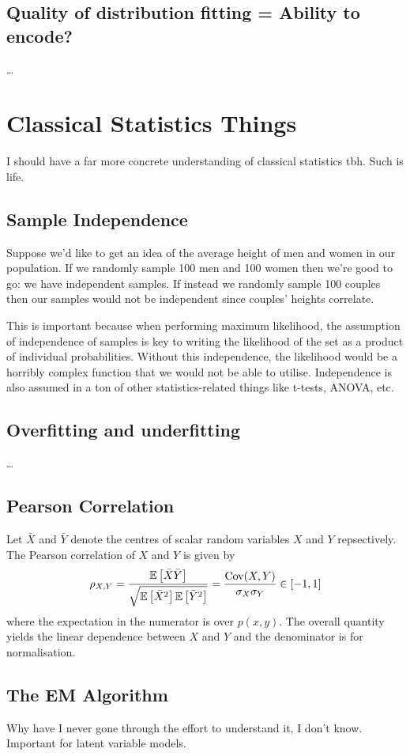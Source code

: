 \documentclass[11pt]{article}
\begin{document}
\begin{appendices}
\subsection{Quality of distribution fitting = Ability to encode?}
\dots

\section{Classical Statistics Things}
I should have a far more concrete understanding of classical statistics tbh. Such is life.

\subsection{Sample Independence}
Suppose we'd like to get an idea of the average height of men and women in our population. If we randomly sample 100 men and 100 women then we're good to go: we have independent samples. If instead we randomly sample 100 couples then our samples would not be independent since couples' heights correlate.

This is important because when performing maximum likelihood, the assumption of independence of samples is key to writing the likelihood of the set as a product of individual probabilities. Without this independence, the likelihood would be a horribly complex function that we would not be able to utilise. Independence is also assumed in a ton of other statistics-related things like t-tests, ANOVA, etc.

\subsection{Overfitting and underfitting}
\dots

\subsection{Pearson Correlation}
Let $\bar{X}$ and $\bar{Y}$ denote the centres of scalar random variables $X$ and $Y$ repsectively. The Pearson correlation of $X$ and $Y$ is given by
$$
\rho_{X,Y}
=
\frac{\mathbb{E}\left[\bar{X}\bar{Y}\right]}{\sqrt{\mathbb{E}\left[\bar{X}^2\right]\mathbb{E}\left[\bar{Y}^2\right]}}
=
\frac{\text{Cov}(X,Y)}{\sigma_X\sigma_Y}
\in[-1,1]
$$
where the expectation in the numerator is over $p(x,y)$. The overall quantity yields the linear dependence between $X$ and $Y$ and the denominator is for normalisation.

\subsection{The EM Algorithm}
Why have I never gone through the effort to understand it, I don't know. Important for latent variable models.


\end{appendices}
\end{document}
